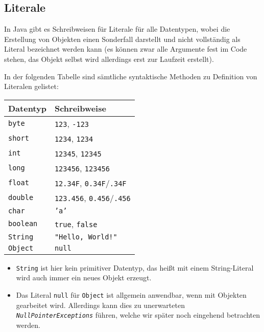 \subsection{Literale}
	
	In Java gibt es Schreibweisen für Literale für alle Datentypen, wobei die Erstellung von Objekten einen Sonderfall darstellt und nicht vollständig als Literal bezeichnet werden kann (es können zwar alle Argumente fest im Code stehen, das Objekt selbst wird allerdings erst zur Laufzeit erstellt).
	
	In der folgenden Tabelle sind sämtliche syntaktische Methoden zu Definition von Literalen gelistet:
	\begin{table}[H]
		\centering
		\begin{tabular}{l | l}
			\textbf{Datentyp} & \textbf{Schreibweise}                          \\ \hline
			\texttt{byte}     & \texttt{123}, \texttt{-123}                    \\
			\texttt{short}    & \texttt{1234}, \texttt{1234}                   \\
			\texttt{int}      & \texttt{12345}, \texttt{12345}                 \\
			\texttt{long}     & \texttt{123456}, \texttt{123456}               \\
			\texttt{float}    & \texttt{12.34F}, \texttt{0.34F}/\texttt{.34F}  \\
			\texttt{double}   & \texttt{123.456}, \texttt{0.456}/\texttt{.456} \\
			\texttt{char}     & \texttt{'a'}                                   \\
			\texttt{boolean}  & \texttt{true}, \texttt{false}                  \\
			\texttt{String}   & \texttt{"Hello, World!"}                       \\
			\texttt{Object}   & \texttt{null}
		\end{tabular}
	\end{table}
	\begin{itemize}
		\item \texttt{String} ist hier kein primitiver Datentyp, das heißt mit einem String-Literal wird auch immer ein neues Objekt erzeugt.
		\item Das Literal \texttt{null} für \texttt{Object} ist allgemein anwendbar, wenn mit Objekten gearbeitet wird. Allerdings kann dies zu unerwarteten \textit{\texttt{NullPointerExceptions}} führen, welche wir später noch eingehend betrachten werden.
	\end{itemize}
	
